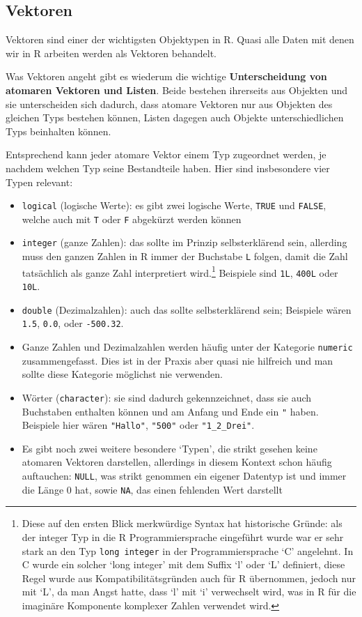 \documentclass[]{tufte-book}
\providecommand{\tightlist}{%
  \setlength{\itemsep}{0pt}\setlength{\parskip}{0pt}}
\begin{document}
\subsection{Vektoren}\label{vektoren}

Vektoren sind einer der wichtigsten Objektypen in R. Quasi alle Daten
mit denen wir in R arbeiten werden als Vektoren behandelt.

Was Vektoren angeht gibt es wiederum die wichtige \textbf{Unterscheidung
von atomaren Vektoren und Listen}. Beide bestehen ihrerseits aus
Objekten und sie unterscheiden sich dadurch, dass atomare Vektoren nur
aus Objekten des gleichen Typs bestehen können, Listen dagegen auch
Objekte unterschiedlichen Typs beinhalten können.

Entsprechend kann jeder atomare Vektor einem Typ zugeordnet werden, je
nachdem welchen Typ seine Bestandteile haben. Hier sind insbesondere
vier Typen relevant:

\begin{itemize}
\tightlist
\item
  \texttt{logical} (logische Werte): es gibt zwei logische Werte,
  \texttt{TRUE} und \texttt{FALSE}, welche auch mit \texttt{T} oder
  \texttt{F} abgekürzt werden können
\item
  \texttt{integer} (ganze Zahlen): das sollte im Prinzip selbsterklärend
  sein, allerding muss den ganzen Zahlen in R immer der Buchstabe
  \texttt{L} folgen, damit die Zahl tatsächlich als ganze Zahl
  interpretiert wird.\footnote{Diese auf den ersten Blick merkwürdige
    Syntax hat historische Gründe: als der integer Typ in die R
    Programmiersprache eingeführt wurde war er sehr stark an den Typ
    \texttt{long\ integer} in der Programmiersprache `C' angelehnt. In C
    wurde ein solcher `long integer' mit dem Suffix `l' oder `L'
    definiert, diese Regel wurde aus Kompatibilitätsgründen auch für R
    übernommen, jedoch nur mit `L', da man Angst hatte, dass `l' mit `i'
    verwechselt wird, was in R für die imaginäre Komponente komplexer
    Zahlen verwendet wird.} Beispiele sind \texttt{1L}, \texttt{400L}
  oder \texttt{10L}.\\
\item
  \texttt{double} (Dezimalzahlen): auch das sollte selbsterklärend sein;
  Beispiele wären \texttt{1.5}, \texttt{0.0}, oder \texttt{-500.32}.
\item
  Ganze Zahlen und Dezimalzahlen werden häufig unter der Kategorie
  \texttt{numeric} zusammengefasst. Dies ist in der Praxis aber quasi
  nie hilfreich und man sollte diese Kategorie möglichst nie verwenden.
\item
  Wörter (\texttt{character}): sie sind dadurch gekennzeichnet, dass sie
  auch Buchstaben enthalten können und am Anfang und Ende ein \texttt{"}
  haben. Beispiele hier wären \texttt{"Hallo"}, \texttt{"500"} oder
  \texttt{"1\_2\_Drei"}.
\item
  Es gibt noch zwei weitere besondere `Typen', die strikt gesehen keine
  atomaren Vektoren darstellen, allerdings in diesem Kontext schon
  häufig auftauchen: \texttt{NULL}, was strikt genommen ein eigener
  Datentyp ist und immer die Länge 0 hat, sowie \texttt{NA}, das einen
  fehlenden Wert darstellt
\end{itemize}
\end{document}
